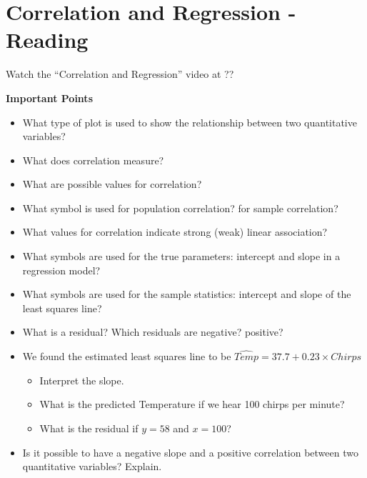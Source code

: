 \def\theTopic{Reading 15}

\section{Correlation and Regression - Reading}

Watch the ``Correlation and Regression'' video at ??


\begin{center}
  {\bf Important Points}
\end{center}

\begin{itemize}
\item What type of plot is used to show the relationship between two
  quantitative variables?\vspace{2cm}
\item What does correlation measure?\vspace{2cm}
\item What are possible values for correlation?  \vspace{2cm}
\item What symbol is used for population correlation?  for sample
  correlation? \vspace{2cm}  
\item What values for correlation indicate strong (weak) linear
  association?\vspace{2cm} 
\item  What symbols are used for the true parameters: intercept and
  slope in a regression model?\vspace{2cm}
\item  What symbols are used for the sample statistics: intercept and
  slope of the least squares line? \vspace{2cm}
\item  What is a residual? Which residuals are negative? positive?\vspace{2cm}
\item  We found the estimated least squares line to be
      $\widehat{Temp} = 37.7 +  0.23\times{Chirps}$ 
      \begin{itemize}
      \item Interpret the slope.\vspace{2cm}
      \item What is the predicted Temperature if we hear 100 chirps per
        minute? \vspace{2cm}
      \item What is the residual if $y = 58$ and $x =
        100$?\vspace{2cm}  
      \end{itemize}
\item Is it possible to have a negative slope and a positive
  correlation between two quantitative variables? Explain.\vspace*{\fill}
\end{itemize}
